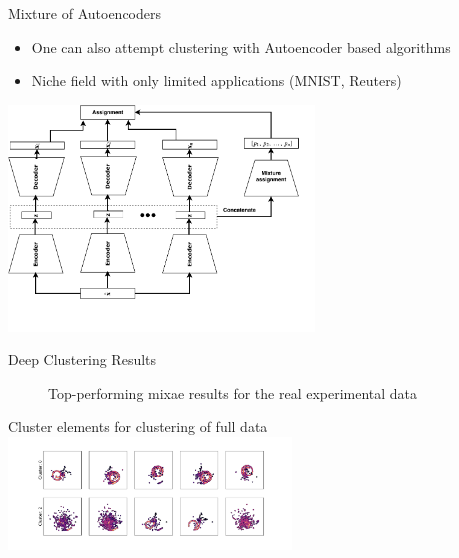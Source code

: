 \documentclass[notes]{beamer}
\begin{document}

\begin{frame}[t]{Mixture of Autoencoders}
	\begin{itemize}
		\item One can also attempt clustering with Autoencoder based algorithms
		\item Niche field with only limited applications (MNIST, Reuters)
	\end{itemize}

	\centering
	\includegraphics[height=6cm]{../chapters/theory/autoencoder/plots/mixae.pdf}
\end{frame}


\begin{frame}[t]{Deep Clustering Results}
	\centering 
	\begin{figure}[h]
		\caption{Top-performing mixae results for the real experimental data}
	\end{figure}
	Cluster elements for clustering of full data
	\includegraphics[height=3cm]{../chapters/results/clustering/plots/real_cluster_repr.pdf}
\end{frame}
\end{document}
